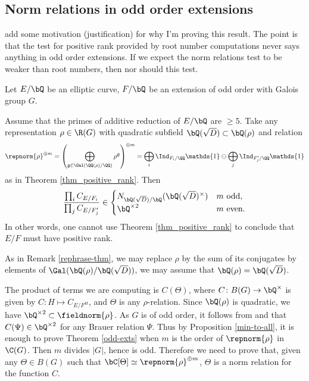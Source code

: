 \subsection{Norm relations in odd order extensions}

{\color{red} add some motivation (justification) for why I'm proving this result. The point is that the test for positive rank provided by root number computations never says anything in odd order extensions. If we expect the norm relations test to be weaker than root numbers, then nor should this test.}

\begin{thm}\label{odd-exts}
 Let $E / \bQ$ be an elliptic curve, $F / \bQ$ be an extension of odd order with Galois group $G$. 
 
Assume that the primes of additive reduction of $E / \bQ$ are $\geq 5$. 
Take any representation $\rho \in \R(G)$ with quadratic subfield $\bQ(\sqrt{D}) \subset \bQ(\rho)$ and relation
\begin{equation*}\label{odd-exp} \repnorm{\rho}^{\oplus m} =
 \left(\bigoplus_{\mathfrak{g}\in\Gal(\QQ(\rho)/\QQ)}\rho^{\mathfrak{g}}\right)^{\oplus m }=\bigoplus_i\Ind_{F_i/\QQ}\mathds{1}\ominus\bigoplus_j\Ind_{F'_j/\QQ}\mathds{1}
\end{equation*}
 as in Theorem \ref{thm_positive_rank}. Then
 \[ \frac{\prod_i C_{E/F_i}}{\prod_j C_{E/F_j'}}  \in 
    \begin{cases}
        N_{\bQ(\sqrt{D}) / \bQ}(\bQ(\sqrt{D})^{\times}) & m \ \text{odd}, \\
        \bQ^{\times 2} & m \ \text{even}.
    \end{cases} \] 
    In other words, one cannot use Theorem \ref{thm_positive_rank} to conclude that $E / F$ must have positive rank. 
\end{thm}

As in Remark \ref{rephrase-thm}, we may replace $\rho$ by the sum of its conjugates by elements of $ \Gal(\bQ(\rho) / \bQ(\sqrt{D}))$, we may assume that $\bQ(\rho) = \bQ(\sqrt{D})$. 

The product of terms we are computing is $C(\Theta)$, where $C \colon B(G) \to \bQ^{\times}$ is given by $C \colon H \mapsto C_{E / F^H}$, and $\Theta$ is any $\rho$-relation. Since $\bQ(\rho)$ is quadratic, we have $\bQ^{\times 2} \subset \fieldnorm{\rho}$. As $G$ is of odd order, it follows from \cite[Theorem 2.47]{reg-const} and \cite[Theorem 3.2  (Tam)]{reg-const} that $C(\Psi) \in \bQ^{\times 2}$ for any Brauer relation $\Psi$. Thus by Proposition \ref{min-to-all}, it is enough to prove Theorem \ref{odd-exts} when $m$ is the order of $\repnorm{\rho}$ in $\C(G)$. Then $m$ divides $|G|$, hence is odd. Therefore we need to prove that, given any $
\Theta \in B(G)$ such that $\bC[\Theta] \simeq \repnorm{\rho}^{\oplus m}$, $\Theta$ is a norm relation for the function $C$. 


